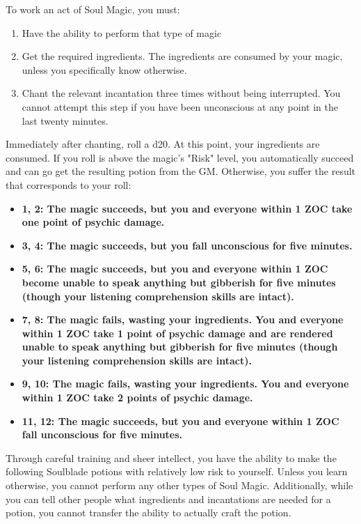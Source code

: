 \documentclass[green]{Kos}
\begin{document}
\name{\gWardSoulMagic{}}


To work an act of Soul Magic, you must:

\begin{enumerate} 
\item Have the ability to perform that type of magic
\item Get the required ingredients. The ingredients are consumed by your magic, unless you specifically know otherwise.
\item Chant the relevant incantation three times without being interrupted. You cannot attempt this step if you have been unconscious at any point in the last twenty minutes.
\end{enumerate}

Immediately after chanting, roll a d20. At this point, your ingredients are consumed. If you roll is above the magic's "Risk" level, you automatically succeed and can go get the resulting potion from the GM. Otherwise, you suffer the result that corresponds to your roll:

\begin{itemize}
\item \bf{1, 2:} The magic succeeds, but you and everyone within 1 ZOC take one point of psychic damage.
\item \bf{3, 4:} The magic succeeds, but you fall unconscious for five minutes.
\item \bf{5, 6:} The magic succeeds, but you and everyone within 1 ZOC become unable to speak anything but gibberish for five minutes (though your listening comprehension skills are intact).
\item \bf{7, 8:} The magic fails, wasting your ingredients.  You and everyone within 1 ZOC take 1 point of psychic damage and are rendered unable to speak anything but gibberish for five minutes (though your listening comprehension skills are intact).
\item \bf{9, 10:} The magic fails, wasting your ingredients. You and everyone within 1 ZOC take 2 points of psychic damage.
\item \bf{11, 12:} The magic succeeds, but you and everyone within 1 ZOC fall unconscious for five minutes.
\end{itemize}
Through careful training and sheer intellect, you have the ability to make the following Soulblade potions with relatively low risk to yourself. Unless you learn otherwise, you cannot perform any other types of Soul Magic. Additionally, while you can tell other people what ingredients and incantations are needed for a potion, you cannot transfer the ability to actually craft the potion.
\end{document}
